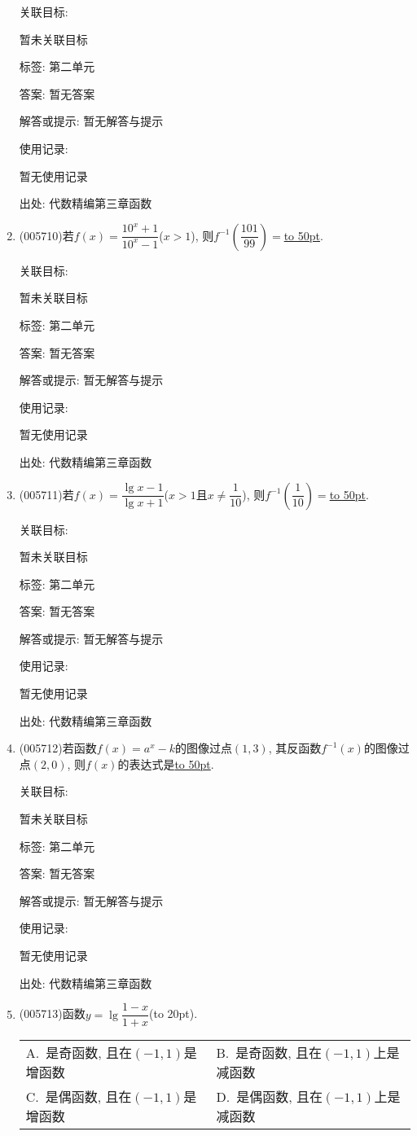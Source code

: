 \documentclass[10pt,a4paper]{article}
\newcommand{\blank}[1]{\underline{\hbox to #1pt{}}}
\newcommand{\bracket}[1]{(\hbox to #1pt{})}
\newcommand{\twoch}[4]{\par\begin{tabular}{p{.46\textwidth}p{.46\textwidth}}
A.~#1& B.~#2\\
C.~#3& D.~#4
\end{tabular}}
\begin{document}
\begin{enumerate}[1.]
关联目标:

暂未关联目标



标签: 第二单元

答案: 暂无答案

解答或提示: 暂无解答与提示

使用记录:

暂无使用记录


出处: 代数精编第三章函数
\item { (005710)}若$f(x)=\dfrac{10^x+1}{10^x-1}$($x>1$), 则$f^{-1}(\dfrac{101}{99})=$\blank{50}.


关联目标:

暂未关联目标



标签: 第二单元

答案: 暂无答案

解答或提示: 暂无解答与提示

使用记录:

暂无使用记录


出处: 代数精编第三章函数
\item { (005711)}若$f(x)=\dfrac{\lg x-1}{\lg x+1}$($x>1$且$x\ne \dfrac 1{10}$), 则$f^{-1}(\dfrac 1{10})=$\blank{50}.


关联目标:

暂未关联目标



标签: 第二单元

答案: 暂无答案

解答或提示: 暂无解答与提示

使用记录:

暂无使用记录


出处: 代数精编第三章函数
\item { (005712)}若函数$f(x)=a^x-k$的图像过点$(1, 3)$, 其反函数$f^{-1}(x)$的图像过点$(2, 0)$, 则$f(x)$的表达式是\blank{50}.


关联目标:

暂未关联目标



标签: 第二单元

答案: 暂无答案

解答或提示: 暂无解答与提示

使用记录:

暂无使用记录


出处: 代数精编第三章函数
\item { (005713)}函数$y=\lg \dfrac{1-x}{1+x}$\bracket{20}.
\twoch{是奇函数, 且在$(-1, 1)$是增函数}{是奇函数, 且在$(-1, 1)$上是减函数}{是偶函数, 且在$(-1, 1)$是增函数}{是偶函数, 且在$(-1, 1)$上是减函数}



\end{enumerate}
\end{document}
